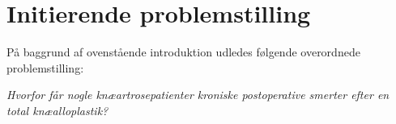 \section{Initierende problemstilling}
På baggrund af ovenstående introduktion udledes følgende overordnede problemstilling: 
\begin{center}
	\textit{Hvorfor får nogle knæartrosepatienter kroniske postoperative smerter efter en total knæalloplastik?}
\end{center}





